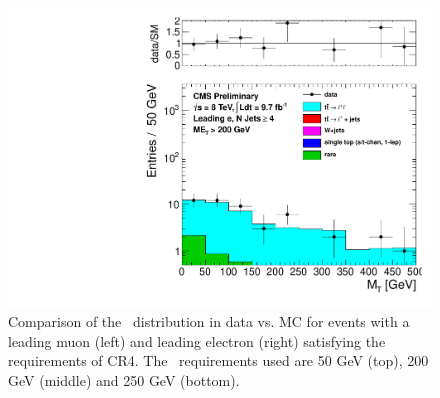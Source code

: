 \begin{figure}[hbt]
\begin{center}
        \includegraphics[width=0.5\linewidth]{plots/CR4plots/mt_met200_leadele_nj4.pdf}
    \caption{
      Comparison of the \mt\ distribution in data vs. MC for events
      with a leading muon (left) and leading electron (right)
      satisfying the requirements of CR4. The \met\ requirements used are
      50 GeV (top), 200 GeV (middle) and 250 GeV (bottom).
\label{fig:cr4mtrest} 
}  
      \end{center}
\end{figure}


\clearpage
